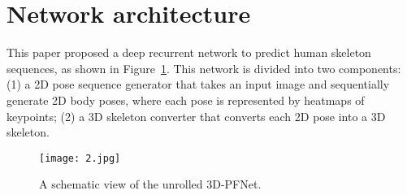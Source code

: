 \documentclass[10pt,twocolumn,letterpaper]{article}
\begin{document}
\section{Network architecture}

This paper proposed a deep recurrent network to predict human skeleton sequences, as shown in Figure~\ref{fig:twocol}. This network is divided into two components: (1) a 2D pose sequence generator that takes an input image and sequentially generate 2D body poses, where each pose is represented by heatmaps of keypoints; (2) a 3D skeleton converter that converts each 2D pose into a 3D skeleton.
\begin{figure}[!htb]
\begin{center}
   \texttt{[image: 2.jpg]}
\end{center}
   \caption{A schematic view of the unrolled 3D-PFNet.}
\label{fig:twocol}
\end{figure}

{\small


}
\end{document}
